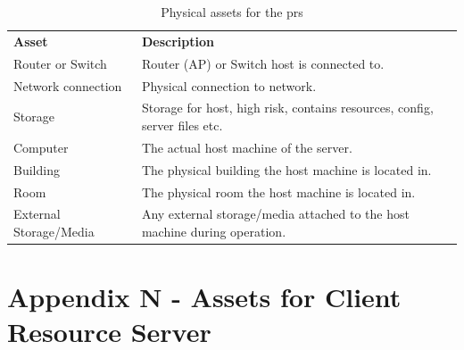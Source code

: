 \begin{appendices}
\begin{table}[htp]
  \begin{tabularx}{\linewidth}{lX}
    \textbf{Asset}          & \textbf{Description} \\
    Router or Switch        &	Router (AP) or Switch host is connected to. \\
    Network connection      &	Physical connection to network. \\
    Storage                 &	Storage for host, high risk, contains resources, config, server files etc. \\
    Computer                &	The actual host machine of the server. \\
    Building                &	The physical building the host machine is located in. \\
    Room                    &	The physical room the host machine is located in. \\
    External Storage/Media  &	Any external storage/media attached to the host machine during operation. \\
  \end{tabularx}
  \caption{Physical assets for the \acrfull{prs}}
  \label{tab:physical_assets_pr}
\end{table}

\clearpage

\section{Appendix N - Assets for Client Resource Server}
\label{appendix:crs_assets}


\end{appendices}
